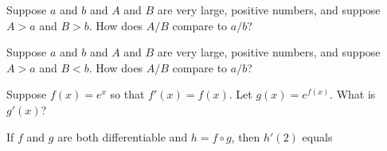 \documentclass{ximera}
\newcommand{\recommendation}[1]{}
\newcommand{\GoodQuestions}[1]{}
\begin{document}
\begin{problem}
  Suppose $a$ and $b$ and $A$ and $B$ are very large, positive numbers, and suppose $A > a$ and $B > b$.  How does $A/B$ compare to $a/b$?
  \begin{multipleChoice}
  \end{multipleChoice}
\end{problem}

\begin{problem}
  Suppose $a$ and $b$ and $A$ and $B$ are very large, positive numbers, and suppose $A > a$ and $B < b$.  How does $A/B$ compare to $a/b$?
  \begin{multipleChoice}
  \end{multipleChoice}
\end{problem}



\begin{problem}
\recommendation{Vic}
  Suppose $f(x) = e^x$ so that $f'(x) = f(x)$.  Let $g(x) = e^{f(x)}$.  What is $g'(x)$?
  \begin{multipleChoice}
  \end{multipleChoice}
\end{problem}


\begin{problem}
  If $f$ and $g$ are both differentiable and $h=f\circ g$,
  then $h'(2)$ equals
  \begin{multipleChoice}
  \end{multipleChoice}
\end{problem}
\end{document}
